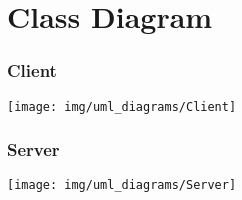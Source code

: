 \chapter{Class Diagram}
\subsection{Client}
\texttt{[image: img/uml\_diagrams/Client]}
\subsection{Server}
\texttt{[image: img/uml\_diagrams/Server]}